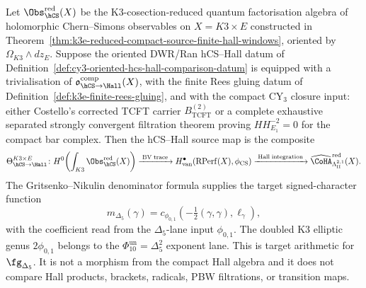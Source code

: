 \begin{proposition}
\label{prop:k3e-borcherds-coefficient-recognition-gate}
\label{constr:k3e-hcs-hall-borcherds-comparison}
Let $\Obs_{\hCS}^{\mathrm{red}}(X)$ be the K3-cosection-reduced quantum factorisation algebra of holomorphic Chern--Simons observables on $X = K3\times E$ constructed in Theorem~\ref{thm:k3e-reduced-compact-source-finite-hall-windows}, oriented by $\Omega_{K3}\wedge dz_E$. Suppose the oriented DWR/Ran hCS--Hall datum of Definition~\ref{def:cy3-oriented-hcs-hall-comparison-datum} is equipped with a trivialisation of $\mathfrak o_{\hCS\to\Hall}^{\mathrm{comp}}(X)$, with the finite Rees gluing datum of Definition~\ref{def:k3e-finite-rees-gluing}, and with the compact CY$_3$ closure input: either Costello's corrected TCFT carrier $B_{\mathrm{TCFT}}^{(2)}$ or a complete exhaustive separated strongly convergent filtration theorem proving $HH^{-2}_{E_1}=0$ for the compact bar complex. Then the hCS--Hall source map is the composite
\[
\ThetaHCSHall\colon
H^0\!\left(\int_{K3}\Obs_{\hCS}^{\mathrm{red}}(X)\right)
\xrightarrow{\;\mathrm{BV\;trace}\;}
H^\bullet_{\mathrm{van}}\!\left(\mathrm{RPerf}(X),\phi_{\mathrm{CS}}\right)
\xrightarrow{\;\mathrm{Hall\;integration}\;}
\widehat{\CoHA}^{\mathrm{red}}_{\Lambda^{2,1}_{\mathrm{II}}}(X).
\]
The Gritsenko--Nikulin denominator formula supplies the target signed-character function
\[
m_{\Delta_5}(\gamma)
=
c_{\phi_{0,1}}\!\left(-\tfrac12(\gamma,\gamma),\ell_\gamma\right),
\]
with the coefficient read from the \(\Delta_5\)-lane input
\(\phi_{0,1}\). The doubled K3 elliptic genus \(2\phi_{0,1}\) belongs to
the \(\Phi_{10}^{\mathrm{un}}=\Delta_5^2\) exponent lane. This is target
arithmetic for \(\fg_{\Delta_5}\). It is not a morphism from the compact
Hall algebra and it does not compare Hall products, brackets, radicals,
PBW filtrations, or transition maps.


\end{proposition}
